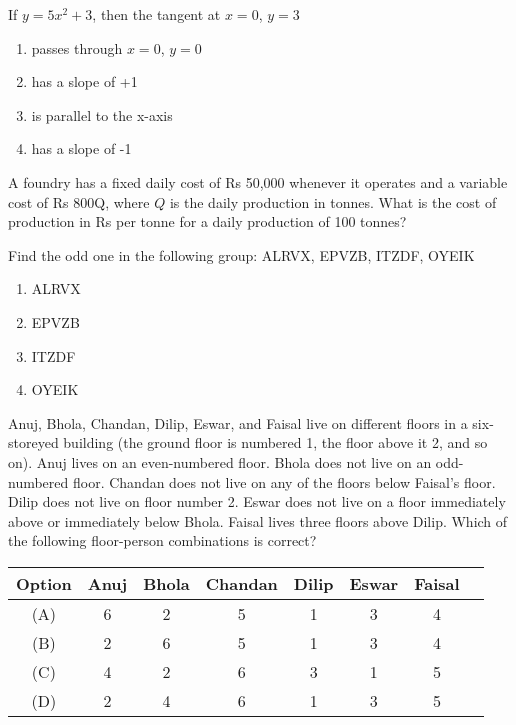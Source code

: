 \item  If $y = 5x^2+ 3$, then the tangent at $x = 0$, $y = 3$

\begin{enumerate}
\item  passes through $x = 0$, $y = 0$
\item  has a slope of +1
\item  is parallel to the x-axis
\item  has a slope of -1
\end{enumerate}

\item 
A foundry has a fixed daily cost of Rs 50,000 whenever it operates and a variable cost of Rs 800Q, where $Q$ is the daily production in tonnes. What is the cost of production in Rs per tonne for a daily production of 100 tonnes?

\item Find the odd one in the following group: ALRVX, EPVZB, ITZDF, OYEIK

\begin{enumerate}
    \item ALRVX
    \item EPVZB
    \item ITZDF
    \item OYEIK
\end{enumerate}


\item Anuj, Bhola, Chandan, Dilip, Eswar, and Faisal live on different floors in a six-storeyed building (the ground floor is numbered 1, the floor above it 2, and so on). Anuj lives on an even-numbered floor. Bhola does not live on an odd-numbered floor. Chandan does not live on any of the floors below Faisal's floor. Dilip does not live on floor number 2. Eswar does not live on a floor immediately above or immediately below Bhola. Faisal lives three floors above Dilip. Which of the following floor-person combinations is correct?


\begin{table}
\centering
\begin{tabular}[12pt]{|c|c|c|c|c|c|c|c|}
\hline
Option & Anuj & Bhola & Chandan & Dilip & Eswar & Faisal \\
\hline
(A) & 6 & 2 & 5 & 1 & 3 & 4 \\
\hline
(B) & 2 & 6 & 5 & 1 & 3 & 4 \\
\hline
(C) & 4 & 2 & 6 & 3 & 1 & 5 \\
\hline
(D) & 2 & 4 & 6 & 1 & 3 & 5 \\
\hline
\end{tabular}
\end{table}





